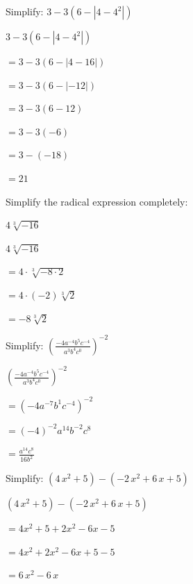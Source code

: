 \documentclass[addpoints,12pt,answers]{exam}
\begin{document}
\begin{questions}

\question[5] Simplify: $3 - 3( 6 - |4 - 4^2| )$
\begin{solution}
$3 - 3( 6 - |4 - 4^2| )$ 

 $= 3 - 3( 6 - |4 - 16| )$ 

 $= 3 - 3( 6 - |-12| )$ 

 $= 3 - 3( 6 - 12 )$ 

 $= 3 - 3( -6 )$ 

 $= 3 - ( -18 )$ 

 $= \boxed{ 21 }$
\end{solution}
\answerline


\question[5] Simplify the radical expression completely: 

 $4 \sqrt[3]{ -16 }$
\begin{solution}
$4 \sqrt[3]{ -16 }$ 

 $= 4 \cdot \sqrt[3]{ -8 \cdot 2 }$ 

 $= 4 \cdot (-2) \sqrt[3]{ 2 }$ 

 $= \boxed{ -8 \sqrt[3]{ 2 } }$
\end{solution}
\answerline


\question[5] Simplify: $\displaystyle \left( \frac{ -4 a^{-4} b^{5} c^{-4} }{ a^{3} b^{4} c^{0} } \right)^{ -2 }$
\begin{solution}
$\displaystyle \left( \frac{ -4 a^{-4} b^{5} c^{-4} }{ a^{3} b^{4} c^{0} } \right)^{ -2 }$ 

 $= \left( -4 a^{-7} b^{1} c^{-4} \right)^{-2}$ 

 $= (-4)^{-2} a^{14} b^{-2} c^{8}$ 

 $= \boxed{ \frac{a^{14}c^{8}}{16b^{2}} }$
\end{solution}
\answerline

\newpage

\question[5] Simplify: $(4 \, x^{2} + 5) - (-2 \, x^{2} + 6 \, x + 5)$
\begin{solution}
$(4 \, x^{2} + 5) - (-2 \, x^{2} + 6 \, x + 5)$ 

 $= 4x^2+5+2x^2-6x-5$ 

 $= 4x^2+2x^2-6x+5-5$ 

 $= \boxed{ 6 \, x^{2} - 6 \, x }$
\end{solution}
\answerline



\end{questions}
\end{document}
